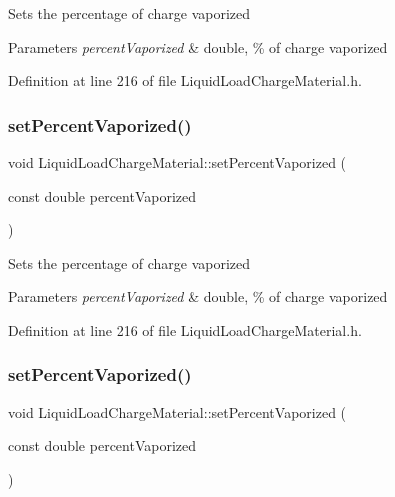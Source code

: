 Sets the percentage of charge vaporized 
\begin{DoxyParams}{Parameters}
{\em percent\+Vaporized} & double, \% of charge vaporized \\
\hline
\end{DoxyParams}


Definition at line 216 of file Liquid\+Load\+Charge\+Material.\+h.

\mbox{\label{class_liquid_load_charge_material_aaf2aa3303201370a7b79e5b3f54e135a}} 
\subsubsection{\texorpdfstring{set\+Percent\+Vaporized()}{setPercentVaporized()}\hspace{0.1cm}{\footnotesize\ttfamily [2/3]}}
{\footnotesize\ttfamily void Liquid\+Load\+Charge\+Material\+::set\+Percent\+Vaporized (\begin{DoxyParamCaption}\item[{const double}]{percent\+Vaporized }\end{DoxyParamCaption})\hspace{0.3cm}{\ttfamily [inline]}}

Sets the percentage of charge vaporized 
\begin{DoxyParams}{Parameters}
{\em percent\+Vaporized} & double, \% of charge vaporized \\
\hline
\end{DoxyParams}


Definition at line 216 of file Liquid\+Load\+Charge\+Material.\+h.

\mbox{\label{class_liquid_load_charge_material_aaf2aa3303201370a7b79e5b3f54e135a}} 
\subsubsection{\texorpdfstring{set\+Percent\+Vaporized()}{setPercentVaporized()}\hspace{0.1cm}{\footnotesize\ttfamily [3/3]}}
{\footnotesize\ttfamily void Liquid\+Load\+Charge\+Material\+::set\+Percent\+Vaporized (\begin{DoxyParamCaption}\item[{const double}]{percent\+Vaporized }\end{DoxyParamCaption})\hspace{0.3cm}{\ttfamily [inline]}}

